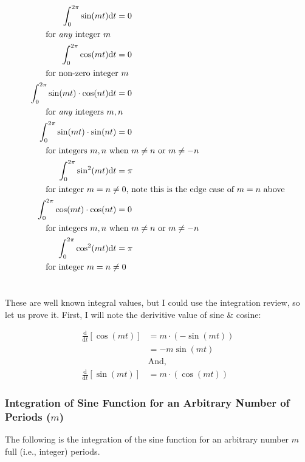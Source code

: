 \documentclass[10pt]{article} %
\begin{document}
\begin{align}
    \int_0^{2\pi} \sin(mt)\mathrm{d}t &= 0 \\
    \intertext{\hspace{0.5cm} for \textit{any} integer $m$}
    \int_0^{2\pi} \cos(mt)\mathrm{d}t &= 0 \\
    \intertext{\hspace{0.5cm} for non-zero integer $m$}
    \int_0^{2\pi} \sin(mt) \cdot \cos(nt)\mathrm{d}t &= 0 \\
    \intertext{\hspace{0.5cm} for \textit{any} integers $m, n$}
    \int_0^{2\pi} \sin(mt) \cdot \sin(nt) &= 0 \\
    \intertext{\hspace{0.5cm} for integers $m,n$ when $m \neq n$ or $m \neq -n$}
    \int_0^{2\pi} \sin^2(mt)\mathrm{d}t &= \pi \\
    \intertext{\hspace{0.5cm} for integer $m = n \neq 0$, note this is the edge case of $m=n$ above}
    \int_0^{2\pi} \cos(mt) \cdot \cos(nt) &= 0 \\
    \intertext{\hspace{0.5cm} for integers $m,n$ when $m \neq n$ or $m \neq -n$}
    \int_0^{2\pi} \cos^2(mt)\mathrm{d}t &= \pi \\
    \intertext{\hspace{0.5cm} for integer $m = n \neq 0$} \notag
\end{align}

These are well known integral values, but I could use the integration review, so let us prove it. First, I will note the derivitive value of sine \& cosine:

\begin{align*}
    \frac{\mathrm{d}}{\mathrm{d}t}[\cos(mt)] & = m\cdot\left(-\sin(mt)\right) \\
    & = -m\sin(mt)\\
    &\text{And,}\\
    \frac{\mathrm{d}}{\mathrm{d}t}[\sin(mt)] & = m\cdot\left(\cos(mt)\right)
\end{align*}

\subsubsection*{Integration of Sine Function for an Arbitrary Number of Periods ($m$)}

The following is the integration of the sine function for an arbitrary number $m$ full (i.e., integer) periods.
\end{document}

